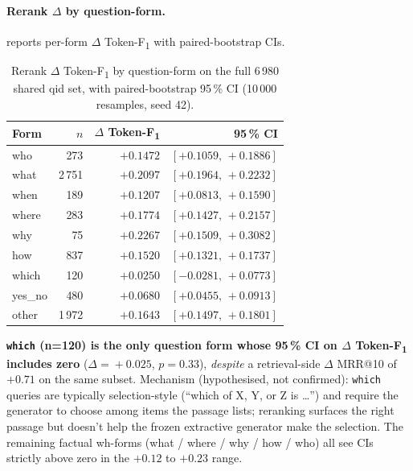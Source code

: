 \documentclass[11pt,a4paper]{article}
\makeatletter
\newcommand{\fdev}{6\,980}
\newcommand{\F}{F\textsubscript{1}}
\newcommand{\Tokenf}{Token-\F}
\newcommand{\mrr}{MRR@10}
\makeatother
\begin{document}
\paragraph{Rerank $\Delta$ by question-form.}
 reports per-form $\Delta$ \Tokenf{} with
paired-bootstrap CIs.

\begin{table}[H]
  \centering
  \caption{Rerank $\Delta$ \Tokenf{} by question-form on
  the full \fdev{} shared qid set, with paired-bootstrap 95\,\% CI
  (10\,000 resamples, seed 42).}
  \label{tab:w6b}
  \begin{tabular}{lrrr}
    \toprule
    Form    & $n$  & $\Delta$ \Tokenf{} & 95\,\% CI \\
    \midrule
    who     &  273 & $+0.1472$ & $[+0.1059,\,+0.1886]$ \\
    what    & 2\,751 & $+0.2097$ & $[+0.1964,\,+0.2232]$ \\
    when    &  189 & $+0.1207$ & $[+0.0813,\,+0.1590]$ \\
    where   &  283 & $+0.1774$ & $[+0.1427,\,+0.2157]$ \\
    why     &   75 & $+0.2267$ & $[+0.1509,\,+0.3082]$ \\
    how     &  837 & $+0.1520$ & $[+0.1321,\,+0.1737]$ \\
    which   &  120 & $+0.0250$ & $[-0.0281,\,+0.0773]$ \\
    yes\_no &  480 & $+0.0680$ & $[+0.0455,\,+0.0913]$ \\
    other   & 1\,972 & $+0.1643$ & $[+0.1497,\,+0.1801]$ \\
    \bottomrule
  \end{tabular}
\end{table}

\textbf{\texttt{which} (n=120) is the only question form whose
95\,\% CI on $\Delta$ \Tokenf{} includes zero} ($\Delta\!=\!+0.025$,
$p\!=\!0.33$), \emph{despite} a retrieval-side $\Delta$ \mrr{} of
$+0.71$ on the same subset.  Mechanism (hypothesised, not
confirmed): \texttt{which} queries are typically selection-style
(``which of X, Y, or Z is \ldots'') and require the generator to
choose among items the passage lists; reranking surfaces the right
passage but doesn't help the frozen extractive generator make the
selection.  The remaining factual wh-forms (what / where / why /
how / who) all see CIs strictly above zero in the $+0.12$ to
$+0.23$ range.
\end{document}
